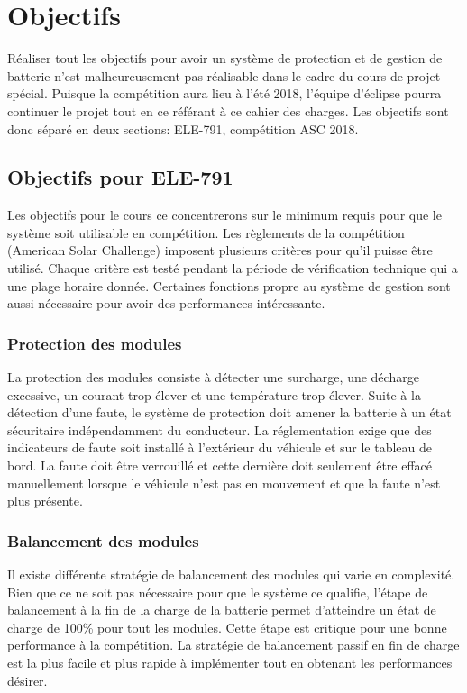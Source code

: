 
\section{Objectifs}
Réaliser tout les objectifs pour avoir un système de protection et de gestion de batterie  n'est malheureusement pas réalisable dans le cadre du cours de projet spécial. Puisque la compétition aura lieu à l'été 2018, l'équipe d'éclipse pourra continuer le projet tout en ce référant à ce cahier des charges. Les objectifs sont donc séparé en deux sections: ELE-791, compétition ASC 2018.  

	\subsection{Objectifs pour ELE-791}	
	Les objectifs pour le cours ce concentrerons sur le minimum requis pour que le système soit utilisable en compétition. Les règlements de la compétition (American Solar Challenge) imposent plusieurs critères pour qu'il puisse être utilisé. Chaque critère est testé pendant la période de vérification technique qui a une plage horaire donnée. Certaines fonctions propre au système de gestion sont aussi nécessaire pour avoir des performances intéressante.
	
		\subsubsection{Protection des modules} \label{protection_module}
		La protection des modules consiste à détecter une surcharge, une décharge excessive, un courant trop élever et une température trop élever. Suite à la détection d'une faute, le système de protection doit amener la batterie à un état sécuritaire indépendamment du conducteur. La réglementation exige que des indicateurs de faute soit installé à l'extérieur du véhicule et sur le tableau de bord. La faute doit être verrouillé et cette dernière doit seulement être effacé manuellement lorsque le véhicule n'est pas en mouvement et que la faute n'est plus présente.
	
		\subsubsection{Balancement des modules}
		Il existe différente stratégie de balancement des modules qui varie en complexité. Bien que ce ne soit pas nécessaire pour que le système ce qualifie, l'étape de balancement à la fin de la charge de la batterie permet d'atteindre un état de charge de 100\% pour tout les modules. Cette étape est critique pour une bonne performance à la compétition. La stratégie de balancement passif en fin de charge est la plus facile et plus rapide à implémenter tout en obtenant les performances désirer. 
				
